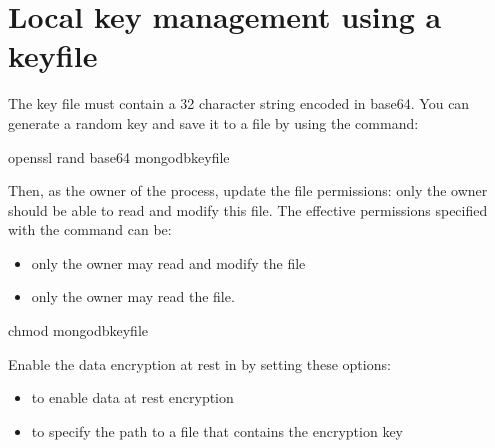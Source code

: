 \documentclass[letterpaper,10pt,english]{sphinxmanual}
\begin{document}
\section{Local key management using a keyfile}
\label{\detokenize{keyfile:local-key-management-using-a-keyfile}}\label{\detokenize{keyfile:keyfile}}\label{\detokenize{keyfile::doc}}
\sphinxAtStartPar
The key file must contain a 32 character string encoded in base64. You can generate a random
key and save it to a file by using the  command:

\begin{sphinxVerbatim}[commandchars=\\\{\}]
\PYGZdl{} openssl rand \PYGZhy{}base64  \PYGZgt{} mongodb\PYGZhy{}keyfile
\end{sphinxVerbatim}

\sphinxAtStartPar
Then, as the owner of the  process, update the file permissions: only
the owner should be able to read and modify this file. The effective permissions
specified with the  command can be:
\begin{itemize}
\item {} 
\sphinxAtStartPar
{} \sphinxhyphen{} only the owner may read and modify the file

\item {} 
\sphinxAtStartPar
{} \sphinxhyphen{} only the owner may read the file.

\end{itemize}

\begin{sphinxVerbatim}[commandchars=\\\{\}]
\PYGZdl{} chmod  mongodb\PYGZhy{}keyfile
\end{sphinxVerbatim}

\sphinxAtStartPar
Enable the data encryption at rest in  by setting these options:
\begin{itemize}
\item {} 
\sphinxAtStartPar
{} to enable data at rest encryption

\item {} 
\sphinxAtStartPar
{} to specify the path to a file that contains the encryption key

\end{itemize}
\end{document}
